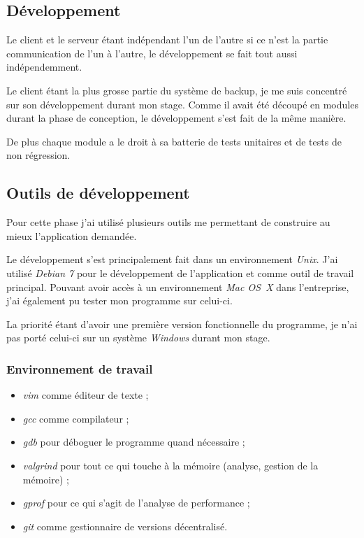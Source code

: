 \documentclass[a4paper,10pt, twoside]{report}
\begin{document}
\begin{spacing}{1.2}
\section{Développement}

Le client et le serveur étant indépendant l'un de l'autre si ce n'est la
partie communication de l'un à l'autre, le développement se fait tout
aussi indépendemment.

Le client étant la plus grosse partie du système de backup, je me suis
concentré sur son développement durant mon stage. Comme il avait été
découpé en modules durant la phase de conception, le développement s'est
fait de la même manière.

De plus chaque module a le droit à sa batterie de tests unitaires et de tests de
non régression.

\subsection{Outils de développement}

Pour cette phase j'ai utilisé plusieurs outils me permettant de construire
au mieux l'application demandée. 

Le développement s'est principalement fait dans un environnement
\textit{Unix}. J'ai utilisé \textit{Debian 7} pour le développement de
l'application et comme outil de travail principal. Pouvant avoir accès à un
environnement \textit{Mac OS~X} dans l'entreprise, j'ai également pu tester
mon programme sur celui-ci.

La priorité étant d'avoir une première version fonctionnelle du
programme, je n'ai pas porté celui-ci sur un système \textit{Windows}
durant mon stage.

\subsubsection{Environnement de travail}
\begin{itemize}
 \item \textit{vim} comme éditeur de texte ;
 \item \textit{gcc} comme compilateur ;
 \item \textit{gdb} pour déboguer le programme quand nécessaire ;
 \item \textit{valgrind} pour tout ce qui touche à la mémoire (analyse,
 gestion de la mémoire) ;
 \item \textit{gprof} pour ce qui s'agit de l'analyse de performance ;
 \item \textit{git} comme gestionnaire de versions décentralisé.
\end{itemize}


\end{spacing}
\end{document}
